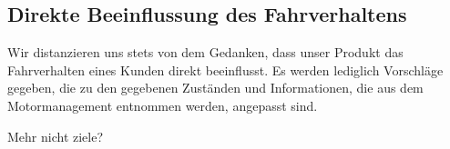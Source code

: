 \subsection{Direkte Beeinflussung des Fahrverhaltens}
Wir distanzieren uns stets von dem Gedanken, dass unser Produkt das Fahrverhalten eines Kunden direkt beeinflusst.
Es werden lediglich Vorschläge gegeben, die zu den gegebenen Zuständen und Informationen,
die aus dem Motormanagement entnommen werden, angepasst sind.


\todo Mehr nicht ziele?